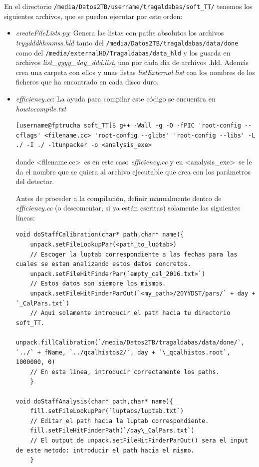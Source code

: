 \documentclass[a4paper]{book}
\begin{document}
En el directorio \texttt{/media/Datos2TB/username/tragaldabas/soft\_TT/} tenemos los siguientes archivos, que se pueden ejecutar por este orden:

\begin{itemize}
	\item \textit{createFileLists.py}: Genera las listas con paths absolutos los archivos \textit{tryydddhhmmss.hld} tanto del \texttt{/media/Datos2TB/tragaldabas/data/done} como del \texttt{/media/externalHD/Tragaldabas/data\_hld} y los guarda en archivos \textit{list\_yyyy\_day\_ddd.list}, uno por cada día de archivos .hld. Además crea una carpeta con ellos y unas listas \textit{listExternal.list} con los nombres de los ficheros que ha encontrado en cada disco duro.
	
	\item \textit{efficiency.cc}: La ayuda para compilar este código se encuentra en \textit{howtocompile.txt}
	
	\begin{lstlisting}[style=customsh]
[username@fptrucha soft_TT]$ g++ -Wall -g -O -fPIC 'root-config --cflags' <filename.cc> 'root-config --glibs' 'root-config --libs' -L ./ -I ./ -ltunpacker -o <analysis_exe>
	\end{lstlisting}
	donde \textless filename.cc\textgreater\ es en este caso \textit{efficiency.cc} y en \textless analysis\_exe\textgreater\ se le da el nombre que se quiera al archivo ejecutable que crea con los parámetros del detector.
	
	Antes de proceder a la compilación, definir manualmente dentro de \textit{efficiency.cc} (o descomentar, si ya están escritas) solamente las siguientes líneas:
	
	\begin{lstlisting}[style=customc]
void doStaffCalibration(char* path,char* name){
	unpack.setFileLookupPar(<path_to_luptab>)
	// Escoger la luptab correspondiente a las fechas para las cuales se estan analizando estos datos concretos.
	unpack.setFileHitFinderPar(`empty_cal_2016.txt>`)
	// Estos datos son siempre los mismos.
	unpack.setFileHitFinderParOut(`<my_path>/20YYDST/pars/` + day + `_CalPars.txt`)
	// Aqui solamente introducir el path hacia tu directorio soft_TT.
	unpack.fillCalibration(`/media/Datos2TB/tragaldabas/data/done/`, `../` + fName, `../qcalhistos2/`, day + `\_qcalhistos.root`, 1000000, 0)
	// En esta linea, introducir correctamente los paths.
	}
	
void doStaffAnalysis(char* path,char* name){
	fill.setFileLookupPar(`luptabs/luptab.txt`)
	// Editar el path hacia la luptab correspondiente.
	fill.setFileHitFinderPath(`/day\_CalPars.txt`)
	// El output de unpack.setFileHitFinderParOut() sera el input de este metodo: introducir el path hacia el mismo.
	}
	

\end{lstlisting}
\end{itemize}
\end{document}
